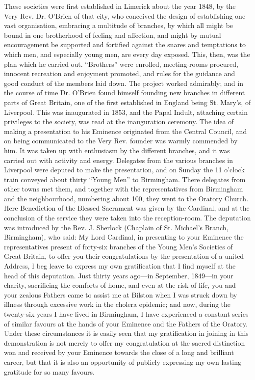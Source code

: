 These societies were first established in Limerick about the year
1848, by the Very Rev. Dr. O'Brien of that city, who conceived the
design of establishing one vast organisation, embracing a multitude of
branches, by which all might be bound in one brotherhood of feeling
and affection, and might by mutual encouragement be supported and
fortified against the snares and temptations to which men, and
especially young men, are every day exposed.
This, then, was the plan which he carried out. ``Brothers''
were enrolled, meeting-rooms procured, innocent recreation and
enjoyment promoted, and rules for the guidance and good conduct of the
members laid down. The project worked admirably; and in the course of
time Dr. O'Brien found himself founding new branches in different
parts of Great Britain, one of the first established in England being
St. Mary's, of Liverpool. This was inaugurated in 1853, and the Papal
Indult, attaching certain privileges to the society, was read at the
inauguration ceremony. The idea of making a presentation to his
Eminence originated from the Central Council, and on being
communicated to the Very Rev. founder was warmly commended by him. It
was taken up with enthusiasm by the different branches, and it was
carried out with activity and energy. Delegates from the various
branches in Liverpool were deputed to make the presentation, and on
Sunday the 11 o'clock train conveyed about thirty ``Young
Men'' to Birmingham. There delegates from other towns met them,
and together with the representatives from Birmingham and the
neighbourhood, numbering about 100, they went to the Oratory Church.
Here Benediction of the Blessed Sacrament was given by the Cardinal,
and at the conclusion of the service they were taken into the
reception-room. The deputation was introduced by the Rev. J. Sherlock
(Chaplain of St. Michael's Branch, Birmingham), who said: My Lord
Cardinal, in presenting to your Eminence the representatives present
of forty-six branches of the Young Men's Societies of Great Britain,
to offer you their congratulations by the presentation of a united
Address, I beg leave to express my own gratification that I find
myself at the head of this deputation. Just thirty
years ago—in September, 1849—in your charity, sacrificing the
comforts of home, and even at the risk of life, you and your zealous
Fathers came to assist me at Bilston when I was struck down by illness
through excessive work in the cholera epidemic; and now, during the
twenty-six years I have lived in Birmingham, I have experienced a
constant series of similar favours at the hands of your Eminence and
the Fathers of the Oratory. Under these circumstances it is easily
seen that my gratification in joining in this demonstration is not
merely to offer my congratulation at the sacred distinction won and
received by your Eminence towards the close of a long and brilliant
career, but that it is also an opportunity of publicly expressing my
own lasting gratitude for so many favours.

